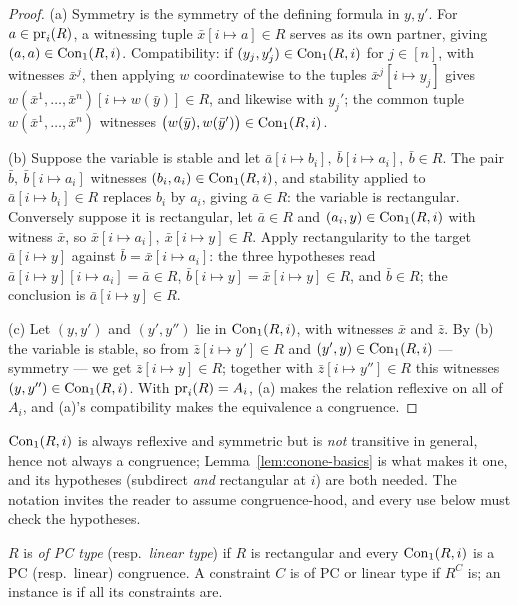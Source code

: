 \begin{proof}
(a) Symmetry is the symmetry of the defining formula in $y,y'$. For
$a\in\operatorname*{pr}_{i}(R)$, a witnessing tuple $\bar x[i\mapsto a]\in R$ serves as its
own partner, giving $(a,a)\in\operatorname{Con}_1(R,i)$. Compatibility: if
$(y_{j},y_{j}')\in\operatorname{Con}_1(R,i)$ for $j\in[n]$, with witnesses
$\bar x^{j}$, then applying $w$ coordinatewise to the tuples
$\bar x^{j}[i\mapsto y_{j}]$ gives
$w(\bar x^{1},\dots,\bar x^{n})[i\mapsto w(\bar y)]\in R$, and likewise with
$y_{j}'$; the common tuple $w(\bar x^{1},\dots,\bar x^{n})$ witnesses
$\bigl(w(\bar y),w(\bar y')\bigr)\in\operatorname{Con}_1(R,i)$.

(b) Suppose the variable is stable and let
$\bar a[i\mapsto b_{i}],\ \bar b[i\mapsto a_{i}],\ \bar b\in R$. The pair
$\bar b,\ \bar b[i\mapsto a_{i}]$ witnesses
$(b_{i},a_{i})\in\operatorname{Con}_1(R,i)$, and stability applied to
$\bar a[i\mapsto b_{i}]\in R$ replaces $b_{i}$ by $a_{i}$, giving
$\bar a\in R$: the variable is rectangular. Conversely suppose it is
rectangular, let $\bar a\in R$ and $(a_{i},y)\in\operatorname{Con}_1(R,i)$ with witness
$\bar x$, so $\bar x[i\mapsto a_{i}],\ \bar x[i\mapsto y]\in R$. Apply
rectangularity to the target $\bar a[i\mapsto y]$ against
$\bar b=\bar x[i\mapsto a_{i}]$: the three hypotheses read
$\bar a[i\mapsto y][i\mapsto a_{i}]=\bar a\in R$,
$\bar b[i\mapsto y]=\bar x[i\mapsto y]\in R$, and $\bar b\in R$; the
conclusion is $\bar a[i\mapsto y]\in R$.

(c) Let $(y,y')$ and $(y',y'')$ lie in $\operatorname{Con}_1(R,i)$, with witnesses
$\bar x$ and $\bar z$. By (b) the variable is stable, so from
$\bar z[i\mapsto y']\in R$ and $(y',y)\in\operatorname{Con}_1(R,i)$ --- symmetry ---
we get $\bar z[i\mapsto y]\in R$; together with
$\bar z[i\mapsto y'']\in R$ this witnesses $(y,y'')\in\operatorname{Con}_1(R,i)$. With
$\operatorname*{pr}_{i}(R)=A_{i}$, (a) makes the relation reflexive on all of $A_{i}$,
and (a)'s compatibility makes the equivalence a congruence.
\end{proof}

\begin{hazard}\label{haz:conone-not-congruence}
$\operatorname{Con}_1(R,i)$ is always reflexive and symmetric but is \emph{not} transitive
in general, hence not always a congruence; Lemma~\ref{lem:conone-basics} is
what makes it one, and its hypotheses (subdirect \emph{and} rectangular at $i$)
are both needed. The notation invites the reader to assume congruence-hood, and
every use below must check the hypotheses.
\end{hazard}

\begin{definition}\label{def:rel-type}
$R$ is \emph{of PC type} (resp.\ \emph{linear type}) if $R$ is rectangular and
every $\operatorname{Con}_1(R,i)$ is a PC (resp.\ linear) congruence. A constraint $C$ is of
PC or linear type if $R^{C}$ is; an instance is if all its constraints are.
\end{definition}

